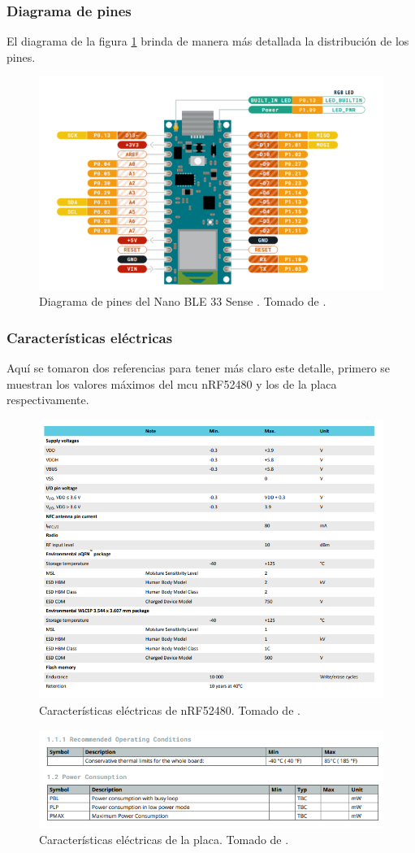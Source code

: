 \subsubsection*{Diagrama de pines}
El diagrama de la figura \ref{fig2} brinda de manera más detallada la distribución de los pines.
\begin{figure}[H]
\centering
\includegraphics[width=.55\linewidth]{Img/2.png}
 \caption{Diagrama de pines del Nano BLE 33 Sense . Tomado de \cite{web2}.}
 \label{fig2}
\end{figure}

\subsubsection*{Características eléctricas}
Aquí se tomaron dos referencias para tener más claro este detalle,  primero se muestran los valores máximos del mcu nRF52480 y los de la placa respectivamente.
\begin{figure}[H]
\centering
\includegraphics[width=.55\linewidth]{Img/3.png}
 \caption{Características eléctricas de nRF52480. Tomado de \cite{web}.}
 \label{fig3}
\end{figure}

\begin{figure}[H]
\centering
\includegraphics[width=.55\linewidth]{Img/3.1.png}
 \caption{ Características eléctricas de la placa. Tomado de \cite{web2}.}
 \label{fig3.1}
\end{figure}

